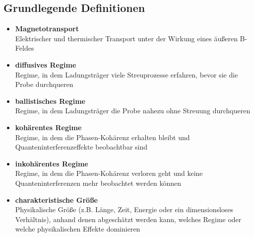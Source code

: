 \documentclass{article}
\begin{document}
\subsection{Grundlegende Definitionen}
	\begin{itemize}
		\item \textbf{Magnetotransport}\\
		Elektrischer und thermischer Transport unter der Wirkung eines äußeren B-Feldes
		
		
		\item \textbf{diffusives Regime}\\
		Regime, in dem Ladungsträger viele Streuprozesse erfahren, bevor sie die Probe durchqueren
		
		
		\item \textbf{ballistisches Regime}\\
		Regime, in dem Ladungsträger die Probe nahezu ohne Streuung durchqueren
		
		
		\item \textbf{kohärentes Regime}\\
		Regime, in dem die Phasen-Kohärenz erhalten bleibt und Quanteninterferenzeffekte beobachtbar sind
		
		
		\item \textbf{inkohärentes Regime}\\
		Regime, in dem die Phasen-Kohärenz verloren geht und keine Quanteninterferenzen mehr beobachtet werden können

		
		\item \textbf{charakteristische Größe}\\
		Physikalische Größe (z.B. Länge, Zeit, Energie oder ein dimensionsloses Verhältnis), anhand denen abgeschätzt werden kann, welches Regime oder welche physikalischen Effekte dominieren
	\end{itemize}
\end{document}
